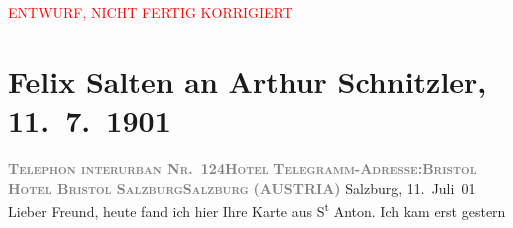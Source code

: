 
\begin{center}
            \textcolor{red}{ENTWURF, NICHT FERTIG KORRIGIERT}
                      \end{center}
            
         
         \renewcommand{\erwaehntePersonen}{Personen: Hugo Felix, Georges Fragerolle, Henri Rivière, Julius Szeps}
         \renewcommand{\erwaehnteInstitutionen}{Institutionen: Le Chat Noir, Wiener Allgemeine Zeitung}
         \renewcommand{\erwaehnteOrte}{Orte: Arlberg, Bad Ischl, Darmstadt, Hotel Bristol Salzburg, Salzburg, St. Anton am Arlberg, Wien, Zürich, Österreich}
         \renewcommand{\erwaehnteWerke}{Werke: Frau Bertha Garlan. Roman, Wiener Allgemeine Zeitung, »Lieutenant Gustl.« (Ein ehrenrätliches Urtheil.)}
               \section[Felix Salten an Arthur Schnitzler, 11. 7. 1901]{ Felix Salten an Arthur Schnitzler, 11. 7. 1901}\nopagebreak{}\rehead{ }\begin{ledgroupsized}[t]{13cm}\normalsize\beginnumbering \toendnotes[C]{\smallbreak\pagebreak[2]} 
\toendnotes[C]{\smallbreak}\pstart
           \noindent{}{\pb}\textcolor{gray}{\textbf{\textsc{Telephon interurban
                        Nr. 124}}}\hfill \textcolor{gray}{\textbf{\textsc{Hotel}}}\pend
           \pstart
           \textcolor{gray}{\textbf{\textsc{Telegramm-Adresse:}}}\hfill \textcolor{gray}{\textbf{\textsc{Bristol}}}\pend
           \pstart
           \textcolor{gray}{\textbf{\textsc{Hotel Bristol Salzburg}}}\hfill \textcolor{gray}{\textbf{\textsc{Salzburg}}}\pend
           \pstart
           \raggedleft{}\textcolor{gray}{\textbf{(AUSTRIA)}}\pend
           \pstart
           \raggedleft{}Salzburg, 11. Juli 01\pend
           \pstart
           Lieber Freund, heute fand ich hier Ihre Karte aus S\textsuperscript{t} Anton. Ich kam erst gestern

\end{ledgroupsized}
